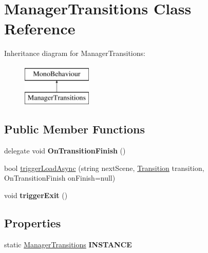 \hypertarget{class_manager_transitions}{\section{Manager\-Transitions Class Reference}
\label{class_manager_transitions}
}
Inheritance diagram for Manager\-Transitions\-:\begin{figure}[H]
\begin{center}
\leavevmode
\includegraphics[height=2.000000cm]{class_manager_transitions}
\end{center}
\end{figure}
\subsection*{Public Member Functions}
\begin{DoxyCompactItemize}
\item 
\hypertarget{class_manager_transitions_af143a676b64ad9405dee52e0b3524db0}{delegate void {\bfseries On\-Transition\-Finish} ()}\label{class_manager_transitions_af143a676b64ad9405dee52e0b3524db0}

\item 
bool \hyperlink{class_manager_transitions_a3ea45c86116b67a94fadc91db88f0f55}{trigger\-Load\-Async} (string next\-Scene, \hyperlink{class_transition}{Transition} transition, On\-Transition\-Finish on\-Finish=null)
\item 
\hypertarget{class_manager_transitions_a7809ff8c65986d89284ae9a7ad570355}{void {\bfseries trigger\-Exit} ()}\label{class_manager_transitions_a7809ff8c65986d89284ae9a7ad570355}

\end{DoxyCompactItemize}
\subsection*{Properties}
\begin{DoxyCompactItemize}
\item 
\hypertarget{class_manager_transitions_ad87cd9fb9a0e05bb97be220bf3f782e1}{static \hyperlink{class_manager_transitions}{Manager\-Transitions} {\bfseries I\-N\-S\-T\-A\-N\-C\-E}}\label{class_manager_transitions_ad87cd9fb9a0e05bb97be220bf3f782e1}

\end{DoxyCompactItemize}


